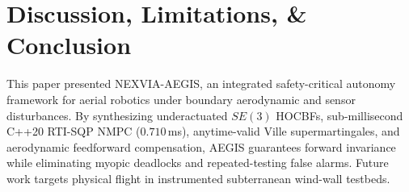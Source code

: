 \documentclass[journal,10pt]{IEEEtran}
\begin{document}
\section{Discussion, Limitations, \& Conclusion}
\label{sec:conclusion}
This paper presented NEXVIA-AEGIS, an integrated safety-critical autonomy framework for aerial robotics under boundary aerodynamic and sensor disturbances. By synthesizing underactuated $SE(3)$ HOCBFs, sub-millisecond C++20 RTI-SQP NMPC ($0.710\,$ms), anytime-valid Ville supermartingales, and aerodynamic feedforward compensation, AEGIS guarantees forward invariance while eliminating myopic deadlocks and repeated-testing false alarms. Future work targets physical flight in instrumented subterranean wind-wall testbeds.

\begingroup
\scriptsize
\def\BIBdecl{\setlength{\itemsep}{-0.5pt}\setlength{\parsep}{0pt}}


\endgroup
\end{document}
